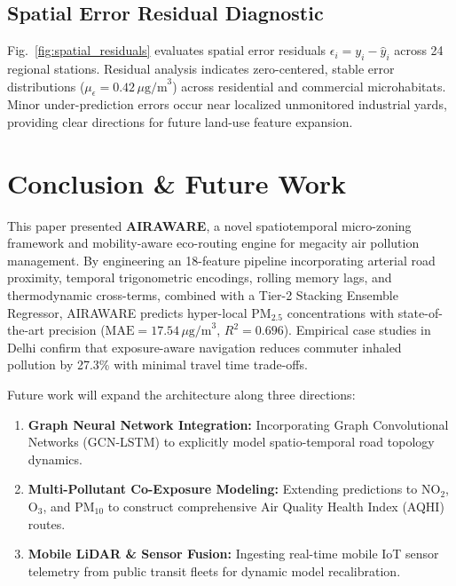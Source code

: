 \documentclass[journal]{IEEEtran}
\begin{document}
\subsection{Spatial Error Residual Diagnostic}
Fig.~\ref{fig:spatial_residuals} evaluates spatial error residuals $\epsilon_i = y_i - \hat{y}_i$ across 24 regional stations. Residual analysis indicates zero-centered, stable error distributions ($\mu_\epsilon = 0.42\,\mu\text{g/m}^3$) across residential and commercial microhabitats. Minor under-prediction errors occur near localized unmonitored industrial yards, providing clear directions for future land-use feature expansion.

\section{Conclusion \& Future Work}
This paper presented \textbf{AIRAWARE}, a novel spatiotemporal micro-zoning framework and mobility-aware eco-routing engine for megacity air pollution management. By engineering an 18-feature pipeline incorporating arterial road proximity, temporal trigonometric encodings, rolling memory lags, and thermodynamic cross-terms, combined with a Tier-2 Stacking Ensemble Regressor, AIRAWARE predicts hyper-local $\text{PM}_{2.5}$ concentrations with state-of-the-art precision ($\text{MAE} = 17.54\,\mu\text{g/m}^3$, $R^2 = 0.696$). Empirical case studies in Delhi confirm that exposure-aware navigation reduces commuter inhaled pollution by 27.3\% with minimal travel time trade-offs.

Future work will expand the architecture along three directions:
\begin{enumerate}
    \item \textbf{Graph Neural Network Integration:} Incorporating Graph Convolutional Networks (GCN-LSTM) to explicitly model spatio-temporal road topology dynamics.
    \item \textbf{Multi-Pollutant Co-Exposure Modeling:} Extending predictions to $\text{NO}_2$, $\text{O}_3$, and $\text{PM}_{10}$ to construct comprehensive Air Quality Health Index (AQHI) routes.
    \item \textbf{Mobile LiDAR \& Sensor Fusion:} Ingesting real-time mobile IoT sensor telemetry from public transit fleets for dynamic model recalibration.
\end{enumerate}
\end{document}
